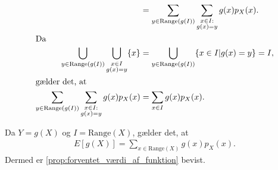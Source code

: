 \begin{bev}
\begin{align}
    &=\sum_{y \in \text{Range}\left(g(I)\right)}\sum_{\substack{x \in I:\\ g(x) =y}} g(x) p_X(x). \nonumber\\
    \intertext{Da}
    \bigcup_{y\in \text{Range}\left(g(I)\right)}\bigcup_{\substack{x\in I\\g(x)=y}}\{x\}&=\bigcup_{y\in\text{Range}\left(g(I)\right)}\{x\in I|g(x)=y\} = I,\nonumber\\
    \intertext{gælder det, at}
    \sum_{y \in \text{Range}\left(g(I)\right)}\sum_{\substack{x \in I:\\ g(x) =y}} g(x) p_X(x)&=\sum_{x\in I}g(x)p_X(x). \nonumber
\end{align}

Da $Y=g(X)$ og $I = \text{Range}(X)$, gælder det, at
\begin{align*}
    E\left[g(X)\right]=\sum_{x\in \text{Range}(X)}g(x)p_X(x).
\end{align*}
Dermed er \autoref{prop:forventet_værdi_af_funktion} bevist.
\end{bev}





